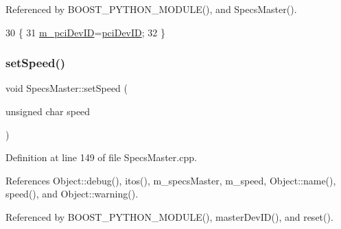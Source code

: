 Referenced by B\+O\+O\+S\+T\+\_\+\+P\+Y\+T\+H\+O\+N\+\_\+\+M\+O\+D\+U\+L\+E(), and Specs\+Master().


\begin{DoxyCode}
30                                           \{
31     \hyperlink{classSpecsMaster_a1a2b2ea916633b7eaee63589946e8909}{m\_pciDevID}=\hyperlink{classSpecsMaster_af4c88071a81c706e2a30ec7786aea707}{pciDevID};
32   \}
\end{DoxyCode}
\mbox{\label{classSpecsMaster_a25c7a250f74f4d1148240f3ab0df160b}} 
\subsubsection{\texorpdfstring{set\+Speed()}{setSpeed()}}
{\footnotesize\ttfamily void Specs\+Master\+::set\+Speed (\begin{DoxyParamCaption}\item[{unsigned char}]{speed }\end{DoxyParamCaption})}



Definition at line 149 of file Specs\+Master.\+cpp.



References Object\+::debug(), itos(), m\+\_\+specs\+Master, m\+\_\+speed, Object\+::name(), speed(), and Object\+::warning().



Referenced by B\+O\+O\+S\+T\+\_\+\+P\+Y\+T\+H\+O\+N\+\_\+\+M\+O\+D\+U\+L\+E(), master\+Dev\+I\+D(), and reset().


